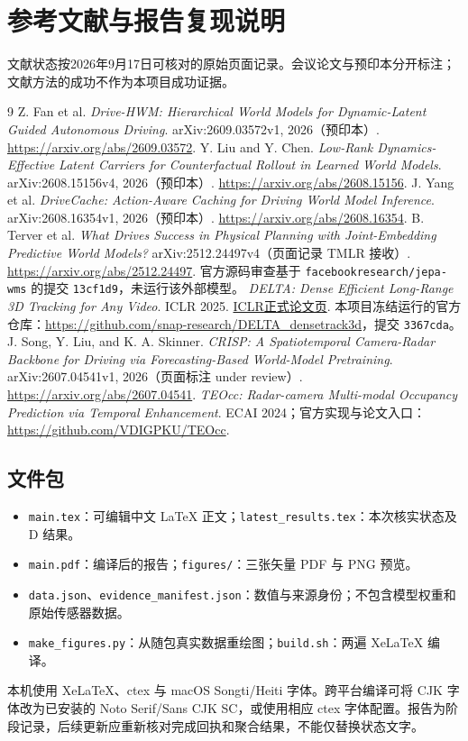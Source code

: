 \documentclass[UTF8,a4paper,11pt,fontset=none]{ctexart}
\begin{document}
\section*{参考文献与报告复现说明}
文献状态按2026年9月17日可核对的原始页面记录。会议论文与预印本分开标注；文献方法的成功不作为本项目成功证据。
\begin{thebibliography}{9}\small
{} Z. Fan et al. \emph{Drive-HWM: Hierarchical World Models for Dynamic-Latent Guided Autonomous Driving}. arXiv:2609.03572v1, 2026（预印本）. \url{https://arxiv.org/abs/2609.03572}.
 Y. Liu and Y. Chen. \emph{Low-Rank Dynamics-Effective Latent Carriers for Counterfactual Rollout in Learned World Models}. arXiv:2608.15156v4, 2026（预印本）. \url{https://arxiv.org/abs/2608.15156}.
 J. Yang et al. \emph{DriveCache: Action-Aware Caching for Driving World Model Inference}. arXiv:2608.16354v1, 2026（预印本）. \url{https://arxiv.org/abs/2608.16354}.
 B. Terver et al. \emph{What Drives Success in Physical Planning with Joint-Embedding Predictive World Models?} arXiv:2512.24497v4（页面记录 TMLR 接收）. \url{https://arxiv.org/abs/2512.24497}. 官方源码审查基于 \texttt{facebookresearch/jepa-wms} 的提交 \texttt{13cf1d9}，未运行该外部模型。
 \emph{DELTA: Dense Efficient Long-Range 3D Tracking for Any Video}. ICLR 2025. \href{https://proceedings.iclr.cc/paper_files/paper/2025/hash/6e1e1d2e58afe1007da0bb76fac722a0-Abstract-Conference.html}{ICLR正式论文页}. 本项目冻结运行的官方仓库：\url{https://github.com/snap-research/DELTA_densetrack3d}，提交 \texttt{3367cda}。
 J. Song, Y. Liu, and K. A. Skinner. \emph{CRISP: A Spatiotemporal Camera-Radar Backbone for Driving via Forecasting-Based World-Model Pretraining}. arXiv:2607.04541v1, 2026（页面标注 under review）. \url{https://arxiv.org/abs/2607.04541}.
 \emph{TEOcc: Radar-camera Multi-modal Occupancy Prediction via Temporal Enhancement}. ECAI 2024；官方实现与论文入口：\url{https://github.com/VDIGPKU/TEOcc}.
\end{thebibliography}

\subsection*{文件包}
\begin{itemize}
\item \texttt{main.tex}：可编辑中文 LaTeX 正文；\texttt{latest\_results.tex}：本次核实状态及 D 结果。
\item \texttt{main.pdf}：编译后的报告；\texttt{figures/}：三张矢量 PDF 与 PNG 预览。
\item \texttt{data.json}、\texttt{evidence\_manifest.json}：数值与来源身份；不包含模型权重和原始传感器数据。
\item \texttt{make\_figures.py}：从随包真实数据重绘图；\texttt{build.sh}：两遍 XeLaTeX 编译。
\end{itemize}
本机使用 XeLaTeX、ctex 与 macOS Songti/Heiti 字体。跨平台编译可将 CJK 字体改为已安装的 Noto Serif/Sans CJK SC，或使用相应 ctex 字体配置。报告为阶段记录，后续更新应重新核对完成回执和聚合结果，不能仅替换状态文字。
\end{document}
